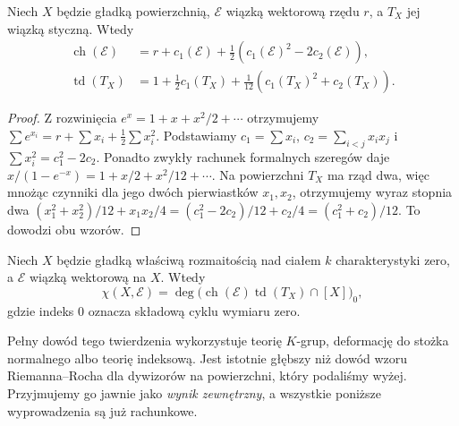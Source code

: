 \begin{lemat}
\label{lem:ga7-ch-td-surface}
Niech $X$ będzie gładką powierzchnią,
$\mathcal E$ wiązką wektorową rzędu $r$,
a $T_X$ jej wiązką styczną. Wtedy
\[
\begin{aligned}
\operatorname{ch}(\mathcal E)&=r+c_1(\mathcal E)
+\tfrac12(c_1(\mathcal E)^2-2c_2(\mathcal E)),\\
\operatorname{td}(T_X)&=1+\tfrac12 c_1(T_X)
+\tfrac1{12}(c_1(T_X)^2+c_2(T_X)).
\end{aligned}
\]
\end{lemat}
\begin{proof}
Z rozwinięcia $e^x=1+x+x^2/2+\cdots$ otrzymujemy
$\sum e^{x_i}=r+\sum x_i+\frac12\sum x_i^2$.
Podstawiamy
$c_1=\sum x_i$, $c_2=\sum_{i<j}x_ix_j$ i
$\sum x_i^2=c_1^2-2c_2$.
Ponadto zwykły rachunek formalnych szeregów daje
$x/(1-e^{-x})=1+x/2+x^2/12+\cdots$.
Na powierzchni $T_X$ ma rząd dwa, więc mnożąc
czynniki dla jego dwóch pierwiastków
$x_1,x_2$, otrzymujemy wyraz stopnia dwa
$(x_1^2+x_2^2)/12+x_1x_2/4
=(c_1^2-2c_2)/12+c_2/4=(c_1^2+c_2)/12$.
To dowodzi obu wzorów.
\end{proof}

\begin{twierdzenie}
\label{tw:ga7-hrr}
Niech $X$ będzie gładką właściwą rozmaitością nad
ciałem $k$ charakterystyki zero, a $\mathcal E$
wiązką wektorową na $X$. Wtedy
\[
\chi(X,\mathcal E)=\deg\bigl(
\operatorname{ch}(\mathcal E)\operatorname{td}(T_X)
\cap[X]\bigr)_{0},
\]
gdzie indeks $0$ oznacza składową cyklu wymiaru zero.
\end{twierdzenie}

\begin{uwaga}
Pełny dowód tego twierdzenia wykorzystuje
teorię $K$-grup, deformację do stożka normalnego
albo teorię indeksową. Jest istotnie
głębszy niż dowód wzoru Riemanna--Rocha dla dywizorów
na powierzchni, który podaliśmy wyżej.
Przyjmujemy go jawnie jako \emph{wynik zewnętrzny},
a wszystkie poniższe wyprowadzenia są już rachunkowe.
\end{uwaga}

